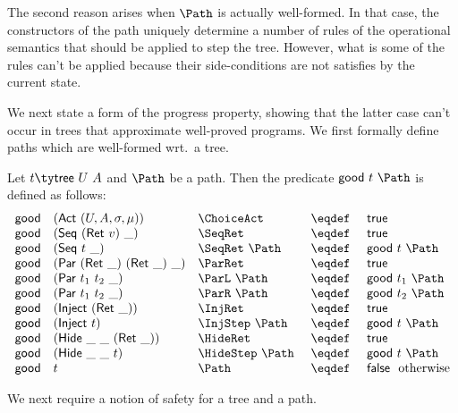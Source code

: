 The second reason arises when $\Path$ is actually well-formed. In that
case, the constructors of the path uniquely determine a number of
rules of the operational semantics that should be applied to step the
tree. However, what is some of the rules can't be applied because
their side-conditions are not satisfies by the current state.

We next state a form of the progress property, showing that the latter
case can't occur in trees that approximate well-proved programs. We
first formally define paths which are well-formed wrt.~a tree.

\begin{definition}
\label{def:good}
Let $t \ty \mathsf{tree}~U~A$ and $\Path$ be a path.  Then the
predicate $\mathsf{good}~t~\Path$ is defined as follows:
\[
\begin{array}{rllcl}
  \mathsf{good} & (\mathsf{Act}~(U, A, \sigma, \mu)) & \ChoiceAct
  & ~\eqdef~ & \mathsf{true}   
  \\
  \mathsf{good} & (\mathsf{Seq}~(\mathsf{Ret}~v)~\_) & \SeqRet
  & ~\eqdef~ & \mathsf{true}  
  \\
  \mathsf{good} & (\mathsf{Seq}~t~\_) & \SeqRet~\Path 
  & ~\eqdef~ & \mathsf{good}~t~\Path 
  \\
  \mathsf{good} & (\mathsf{Par}~(\mathsf{Ret}~\_)~(\mathsf{Ret}~\_)~\_) & \ParRet 
  & ~\eqdef~ & \mathsf{true}  
  \\
  \mathsf{good} & (\mathsf{Par}~t_1~t_2~\_) & \ParL~\Path
  & ~\eqdef~ & \mathsf{good}~t_1~\Path
  \\
  \mathsf{good} & (\mathsf{Par}~t_1~t_2~\_) & \ParR~\Path 
  & ~\eqdef~ & \mathsf{good}~t_2~\Path
  \\
  \mathsf{good} & (\mathsf{Inject}~(\mathsf{Ret}~\_)) & \InjRet
  & ~\eqdef~ & \mathsf{true}
  \\
  \mathsf{good} & (\mathsf{Inject}~t) & \InjStep~\Path 
  & ~\eqdef~ & \mathsf{good}~t~\Path 
  \\
  \mathsf{good} & (\mathsf{Hide}~\_~\_~(\mathsf{Ret}~\_)) & \HideRet
  & ~\eqdef~ & \mathsf{true}
  \\
  \mathsf{good} & (\mathsf{Hide}~\_~\_~t) & \HideStep~\Path 
  & ~\eqdef~ & \mathsf{good}~t~\Path 
  \\
  \mathsf{good} & t & \Path 
  & ~\eqdef~ & \mathsf{false} \text{~~otherwise}
\end{array}
\]

\end{definition}

We next require a notion of safety for a tree and a path.

